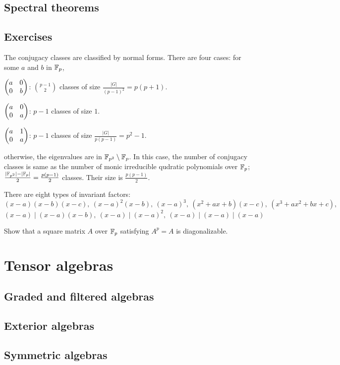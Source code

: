 \documentclass{../../large}
\begin{document}
\begin{prb}
\end{prb}

\section{Spectral theorems}

\section*{Exercises}

\begin{prb}
The conjugacy classes are classified by normal forms.
There are four cases: for some $a$ and $b$ in $\mathbb{F}_p$,
\begin{parts}
\item $\begin{pmatrix}a&0\\0&b\end{pmatrix}$: $\binom{p-1}2$ classes of size $\frac{|G|}{(p-1)^2}=p(p+1)$.
\item $\begin{pmatrix}a&0\\0&a\end{pmatrix}$: $p-1$ classes of size $1$.
\item $\begin{pmatrix}a&1\\0&a\end{pmatrix}$: $p-1$ classes of size $\frac{|G|}{p(p-1)}=p^2-1$.
\item otherwise, the eigenvalues are in $\mathbb{F}_{p^2}\setminus\mathbb{F}_p$.
In this case, the number of conjugacy classes is same as the number of monic irreducible qudratic polynomials over $\mathbb{F}_p$; $\frac{|\mathbb{F}_{p^2}|-|\mathbb{F}_p|}2=\frac{p(p-1)}2$ classes.
Their size is $\frac{p(p-1)}2$.
\end{parts}
\end{prb}

\begin{prb}
There are eight types of invariant factors:
\[(x-a)(x-b)(x-c),\ (x-a)^2(x-b),\ (x-a)^3,\ (x^2+ax+b)(x-c),\ (x^3+ax^2+bx+c),\]
\[(x-a)\mid(x-a)(x-b),\ (x-a)\mid(x-a)^2,\ (x-a)\mid(x-a)\mid(x-a)\]
\end{prb}

Show that a square matrix $A$ over $\mathbb{F}_p$ satisfying $A^p=A$ is diagonalizable.



\chapter{Tensor algebras}
\section{Graded and filtered algebras}
\section{Exterior algebras}
\begin{prb}[Determinants]
\end{prb}
\section{Symmetric algebras}
\end{document}
